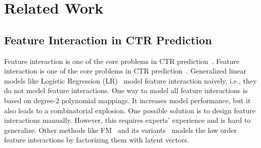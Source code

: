 \documentclass[conference]{IEEEtran}
\begin{document}
 \section{Related Work}
\label{sec:rw}

\subsection{Feature Interaction in CTR Prediction}

Feature interaction is one of the core problems in CTR prediction~\cite{FNN,PNN16,PNN19,DeepFM,AutoFeature,AutoFis,CAN}. Feature interaction is one of the core problems in CTR prediction~\cite{FNN,PNN16,PNN19,DeepFM,AutoFeature,AutoFis,CAN}. Generalized linear models like Logistic Regression (LR)~\cite{LR,GBDT} model feature interaction naively, i.e., they do not model feature interactions. One way to model all feature interactions is based on degree-2 polynomial mappings\cite{Poly-2}. It increases model performance, but it also leads to a combinatorial explosion. One possible solution is to design feature interactions manually. However, this requires experts' experience and is hard to generalize. Other methods like FM~\cite{FM} and its variants~\cite{FwFM,FFM} models the low order feature interactions by factorizing them with latent vectors.
\end{document}
